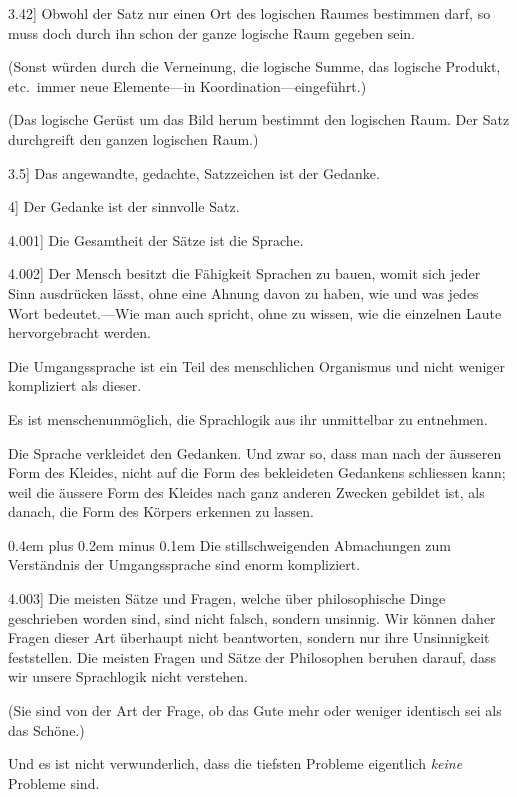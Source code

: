 \documentclass[12pt,oneside]{book}[2007/10/19]
\newcommand{\PropERef}[1]{\hyperref[PropE:#1]{#1}}
\newcommand{\PropositionG}[2]{%
  \item[\phantomsection\label{PropG:#1}\PropERef{#1}] #2%
}
\newcommand{\DPtypo}[2]{#2}
\newcommand{\Emph}[1]{\emph{#1}}%
\newcommand{\stretchyspace}{\spaceskip0.4em plus 0.2em minus 0.1em}
\begin{document}
\begin{propositions}
\PropositionG{3.42}
{Obwohl der Satz nur einen Ort des logischen
Raumes bestimmen darf, so muss doch durch
ihn schon der ganze logische Raum gegeben
sein.

(Sonst würden durch die Verneinung, die logische
Summe, das logische Produkt, etc.\ immer neue
Elemente---in Ko\-or\-di\-na\-ti\-on---eingeführt.)

(Das logische Gerüst um das Bild herum bestimmt
den logischen Raum. Der Satz durchgreift den
ganzen logischen Raum.)}


\PropositionG{3.5}
{Das angewandte, gedachte, Satzzeichen ist der
Gedanke.}


\PropositionG{4}
{Der Gedanke ist der sinnvolle Satz.}


\PropositionG{4.001}
{Die Gesamtheit der Sätze ist die Sprache.}


\PropositionG{4.002}
{Der Mensch besitzt die Fähigkeit Sprachen zu
bauen, womit sich jeder Sinn ausdrücken lässt,
ohne eine Ahnung davon zu haben, wie und was
jedes Wort bedeutet.---Wie man auch spricht, ohne
zu wissen, wie die einzelnen Laute hervorgebracht
werden.

Die Umgangssprache ist ein Teil des menschlichen
Organismus und nicht weniger kompliziert als
dieser.

Es ist menschenunmöglich, die Sprachlogik aus
ihr unmittelbar zu entnehmen.

Die Sprache verkleidet den Gedanken. Und
zwar so, dass man nach der äusseren Form des
Kleides, nicht auf die Form des bekleideten Gedankens
schliessen kann; weil die äussere Form des
Kleides nach ganz anderen Zwecken gebildet ist, als
danach, die Form des Körpers erkennen zu lassen.

{\stretchyspace
Die stillschweigenden Abmachungen zum Verständnis
der Umgangssprache sind enorm kompliziert.}}


\PropositionG{4.003}
{Die meisten Sätze und Fragen, welche über
philosophische Dinge geschrieben worden sind, sind
nicht falsch, sondern unsinnig. Wir können daher
Fragen dieser Art überhaupt nicht beantworten,
sondern nur ihre Unsinnigkeit feststellen. Die
meisten Fragen und Sätze der Philosophen beruhen
darauf, \DPtypo{das}{dass} wir unsere Sprachlogik nicht verstehen.

(Sie sind von der Art der Frage, ob das Gute
\enlargethispage{1pt} %
mehr oder weniger identisch sei als das Schöne.)

Und es ist nicht verwunderlich, dass die tiefsten
Probleme eigentlich \Emph{keine} Probleme sind.}



\end{propositions}
\end{document}
